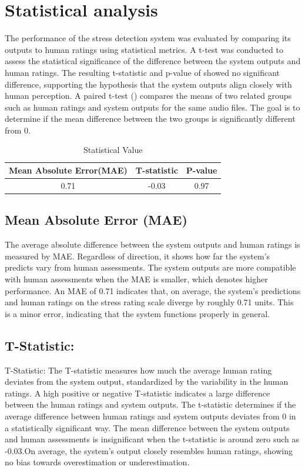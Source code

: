 \documentclass[Arial,12pt,openright,twoside]{book}
\begin{document}
\section{Statistical analysis}
The performance of the stress detection system was evaluated by comparing its outputs to human ratings using statistical metrics. A t-test was conducted to assess the statistical significance of the difference between the system outputs and human ratings. The resulting t-statistic and p-value of showed no significant difference, supporting the hypothesis that the system outputs align closely with human perception. A paired t-test (\citet{pairedttest2025}) compares the means of two related groups such as human ratings and system outputs for the same audio files. The goal is to determine if the mean difference between the two groups is significantly different from 0.
\begin{table}[H] %
\centering
\caption{Statistical Value} 
\label{tab:correlation_table} %
 \begin{tabular}{|c|c|c|}
        \hline
         Mean Absolute Error(MAE) & T-statistic & P-value \\ \hline
            0.71 &  -0.03 & 0.97 \\ \hline
    \end{tabular}%
   \end{table}
   \vspace{10pt} %

\subsection{Mean Absolute Error (MAE)}
The average absolute difference between the system outputs and human ratings is measured by MAE. Regardless of direction, it shows how far the system's predicts vary from human assessments.  The system outputs are more compatible with human assessments when the MAE is smaller, which denotes higher performance. An MAE of 0.71 indicates that, on average, the system's predictions and human ratings on the stress rating scale diverge by roughly 0.71 units. This is a minor error, indicating that the system functions properly in general.
\subsection{T-Statistic: }
T-Statistic: The T-statistic measures how much the average human rating deviates from the system output, standardized by the variability in the human ratings. A high positive or negative T-statistic indicates a large difference between the human ratings and system outputs. The t-statistic determines if the average difference between human ratings and system outputs deviates from 0 in a statistically significant way. The mean difference between the system outputs and human assessments is insignificant when the t-statistic is around zero such as -0.03.On average, the system's output closely resembles human ratings, showing no bias towards overestimation or underestimation.
\end{document}
